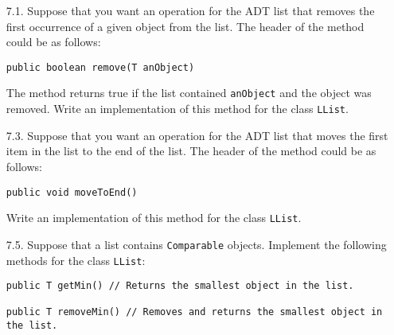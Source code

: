 \documentclass[10pt]{article}
\begin{document}
\begin{enumerate}
		\item[7.1.] Suppose that you want an operation for the ADT list that removes the first occurrence of a given object from the list. The header of the method could be as follows:
			\begin{lstlisting}
public boolean remove(T anObject)
			\end{lstlisting}
			The method returns true if the list contained \texttt{anObject} and the object was removed. Write an implementation of this method for the class \texttt{LList}.
		
		\item[7.3.] Suppose that you want an operation for the ADT list that moves the first item in the list to the end of the list. The header of the method could be as follows:
			\begin{lstlisting}
public void moveToEnd()
			\end{lstlisting}
			Write an implementation of this method for the class \texttt{LList}.
		
		\item[7.5.] Suppose that a list contains \texttt{Comparable} objects. Implement the following methods for the class \texttt{LList}:
			\begin{lstlisting}
public T getMin() // Returns the smallest object in the list.

public T removeMin() // Removes and returns the smallest object in the list.
			\end{lstlisting}
	\end{enumerate}
\end{document}
